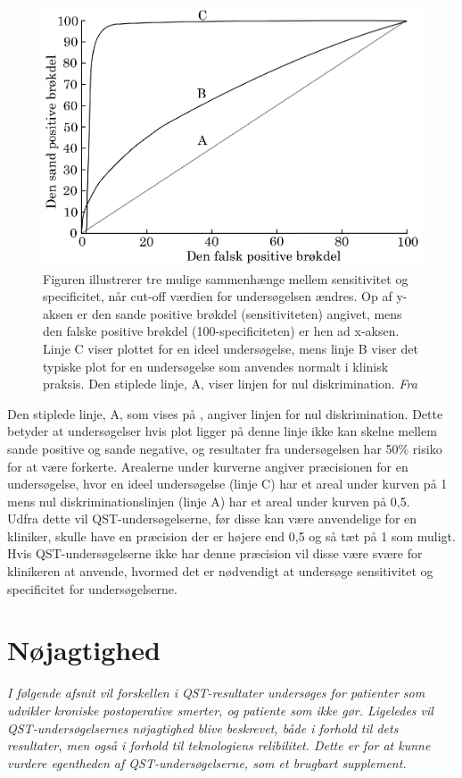 \begin{figure}[H]
\centering
\includegraphics[width=\textwidth]{figures/dHTAanalyse/AUC}
\caption{Figuren illustrerer tre mulige sammenhænge mellem sensitivitet og specificitet, når cut-off værdien for undersøgelsen ændres. Op af y-aksen er den sande positive brøkdel (sensitiviteten) angivet, mens den falske positive brøkdel (100-specificiteten) er hen ad x-aksen. Linje C viser plottet for en ideel undersøgelse, mens linje B viser det typiske plot for en undersøgelse som anvendes normalt i klinisk praksis. Den stiplede linje, A, viser linjen for nul diskrimination. \textit{Fra }}\label{fig:AUC}
\end{figure}

Den stiplede linje, A, som vises på , angiver linjen for nul diskrimination. Dette betyder at undersøgelser hvis plot ligger på denne linje ikke kan skelne mellem sande positive og sande negative, og resultater fra undersøgelsen har 50\% risiko for at være forkerte. Arealerne under kurverne angiver præcisionen for en undersøgelse, hvor en ideel undersøgelse (linje C) har et areal under kurven på 1 mens nul diskriminationslinjen (linje A) har et areal under kurven på 0,5. \\
Udfra dette vil QST-undersøgelserne, før disse kan være anvendelige for en kliniker, skulle have en præcision der er højere end 0,5 og så tæt på 1 som muligt. Hvis QST-undersøgelserne ikke har denne præcision vil disse være svære for klinikeren at anvende, hvormed det er nødvendigt at undersøge sensitivitet og specificitet for undersøgelserne.   

\section{Nøjagtighed}
\textit{I følgende afsnit vil forskellen i QST-resultater undersøges for patienter som udvikler kroniske postoperative smerter, og patiente som ikke gør. Ligeledes vil QST-undersøgelsernes nøjagtighed blive beskrevet, både i forhold til dets resultater, men også i forhold til teknologiens relibilitet. Dette er for at kunne vurdere egentheden af QST-undersøgelserne, som et brugbart supplement.}

